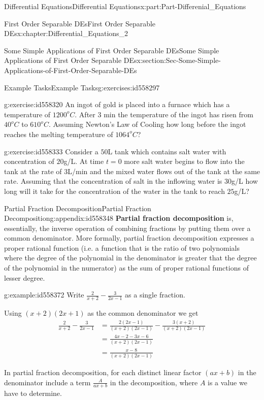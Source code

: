 \documentclass[oneside,10pt,]{book}
\newcommand{\terminology}[1]{\textbf{#1}}
\numberwithin{equation}{section}
\newcommand{\amp}{&}
\begin{document}
\begin{partptx}{Differential Equations}{}{Differential Equations}{}{}{x:part:Part-Differenial_Equations}
\begin{chapterptx}{First Order Separable DEs}{}{First Order Separable DEs}{}{}{x:chapter:Differential_Equations_2}
\begin{sectionptx}{Some Simple Applications of First Order Separable DEs}{}{Some Simple Applications of First Order Separable DEs}{}{}{x:section:Sec-Some-Simple-Applications-of-First-Order-Separable-DEs}
\begin{exercises-subsection-numberless}{Example Tasks}{}{Example Tasks}{}{}{g:exercises:id558297}
\begin{divisionexercise}{1}{}{}{g:exercise:id558320}
An ingot of gold is placed into a furnace which has a temperature of \(1200^oC\).  After \(3\) min the temperature of the ingot has risen from \(40^oC\) to \(610^oC\). Assuming Newton’s Law of Cooling how long before the ingot reaches the melting temperature of \(1064^oC\)?%
\end{divisionexercise}%
\begin{divisionexercise}{2}{}{}{g:exercise:id558333}%
Consider a \(50\)L tank which contains salt water with concentration of \(20\)g\slash{}L. At time \(t=0\) more salt water begins to flow into the tank at the rate of \(3\)L\slash{}min and the mixed water flows out of the tank at the same rate. Assuming that the concentration of salt in the inflowing water is \(30\)g\slash{}L how long will it take for the concentration of the water in the tank to reach \(25\)g\slash{}L?%
\end{divisionexercise}%
\end{exercises-subsection-numberless}
\end{sectionptx}
%
%
\typeout{************************************************}
\typeout{************************************************}
%
\begin{appendixptx}{Partial Fraction Decomposition}{}{Partial Fraction Decomposition}{}{}{g:appendix:id558348}
\terminology{Partial fraction decomposition} is, essentially, the inverse operation of combining fractions by putting them over a common denominator. More formally, partial fraction decomposition expresses a proper rational function (i.e. a function that is the ratio of two polynomials where the degree of the polynomial in the denominator is greater that the degree of the polynomial in the numerator) as the sum of proper rational functions of lesser degree.%
\begin{example}{}{g:example:id558372}%
Write \(\frac{2}{x+2}-\frac{3}{2x-1}\) as a single fraction.%
\par\smallskip%
\noindent\hypertarget{g:solution:id558370}{}Using \((x+2)(2x+1)\) as the common denominator we get %
\begin{align*}
\frac{2}{x+2}-\frac{3}{2x-1} \amp=\frac{2(2x-1)}{(x+2)(2x-1)}-\frac{3(x+2)}{(x+2)(2x-1)}\\
\amp =\frac{4x-2-3x-6}{(x+2)(2x-1)}\\
\amp =\frac{x-8}{(x+2)(2x-1)}
\end{align*}
%
%
\end{example}
In partial fraction decomposition, for each distinct linear factor \((ax+b)\) in the denominator include a term \(\frac{A}{ax+b}\) in the decomposition, where \(A\) is a value we have to determine.%

\end{appendixptx}
\end{chapterptx}
\end{partptx}
\end{document}
